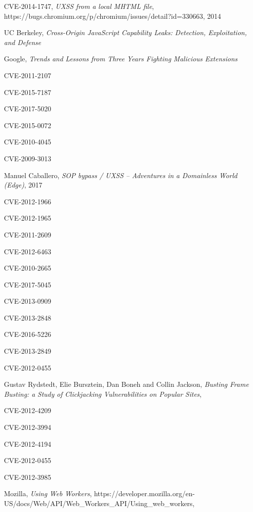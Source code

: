 \documentclass[journal]{IEEEtran}
\begin{document}
\begin{thebibliography}{1}
CVE-2014-1747,
\textit{UXSS from a local MHTML file},
https://bugs.chromium.org/p/chromium/issues/detail?id=330663,
2014

UC Berkeley,
\textit{Cross-Origin JavaScript Capability Leaks: Detection, Exploitation, and Defense}


Google,
\textit{Trends and Lessons from Three Years Fighting Malicious Extensions}

CVE-2011-2107

CVE-2015-7187

CVE-2017-5020

CVE-2015-0072

CVE-2010-4045

CVE-2009-3013

Manuel Caballero,
\textit{SOP bypass / UXSS – Adventures in a Domainless World (Edge)},
2017

CVE-2012-1966

CVE-2012-1965

CVE-2011-2609

CVE-2012-6463

CVE-2010-2665

CVE-2017-5045

CVE-2013-0909

CVE-2013-2848

CVE-2016-5226

CVE-2013-2849

CVE-2012-0455

Gustav Rydstedt, Elie Bursztein, Dan Boneh and Collin Jackson,
\textit{Busting Frame Busting:
a Study of Clickjacking Vulnerabilities on Popular Sites},

CVE-2012-4209

CVE-2012-3994

CVE-2012-4194

CVE-2012-0455

CVE-2012-3985

Mozilla,
\textit{Using Web Workers},
https://developer.mozilla.org/en-US/docs/Web/API/Web\_Workers\_API/Using\_web\_workers,


\end{thebibliography}

\ifCLASSOPTIONcaptionsoff
  \newpage
\fi
\end{document}
